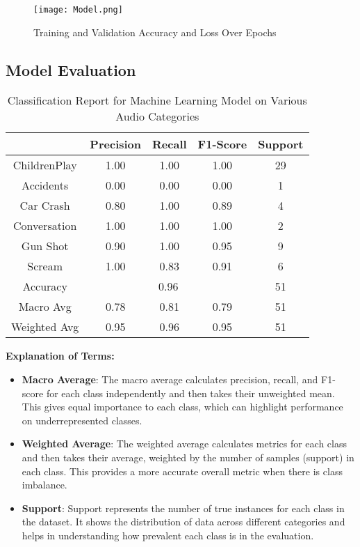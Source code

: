 \documentclass[conference]{IEEEtran}
\begin{document}
\begin{figure}[h!]
    \centering
    \texttt{[image: Model.png]}
    \caption{Training and Validation Accuracy and Loss Over Epochs}
    \label{fig:loss_plot}
\end{figure}

\subsection{Model Evaluation}
\begin{table}[h!]
    \centering
    \caption{Classification Report for Machine Learning Model on Various Audio Categories}
    \begin{tabular}{|c|c|c|c|c|}
        \hline
        & \textbf{Precision} & \textbf{Recall} & \textbf{F1-Score} & \textbf{Support} \\
        \hline
        ChildrenPlay & 1.00 & 1.00 & 1.00 & 29 \\
        Accidents & 0.00 & 0.00 & 0.00 & 1 \\
        Car Crash & 0.80 & 1.00 & 0.89 & 4 \\
        Conversation & 1.00 & 1.00 & 1.00 & 2 \\
        Gun Shot & 0.90 & 1.00 & 0.95 & 9 \\
        Scream & 1.00 & 0.83 & 0.91 & 6 \\
        \hline
        Accuracy & \multicolumn{3}{c|}{0.96} & 51 \\
        \hline
        Macro Avg & 0.78 & 0.81 & 0.79 & 51 \\
        Weighted Avg & 0.95 & 0.96 & 0.95 & 51 \\
        \hline
    \end{tabular}
    \label{tab:classification_report}
\end{table}

\noindent
\textbf{Explanation of Terms:}
\begin{itemize}
    \item \textbf{Macro Average}: The macro average calculates precision, recall, and F1-score for each class independently and then takes their unweighted mean. This gives equal importance to each class, which can highlight performance on underrepresented classes.
    \item \textbf{Weighted Average}: The weighted average calculates metrics for each class and then takes their average, weighted by the number of samples (support) in each class. This provides a more accurate overall metric when there is class imbalance.
    \item \textbf{Support}: Support represents the number of true instances for each class in the dataset. It shows the distribution of data across different categories and helps in understanding how prevalent each class is in the evaluation.    
\end{itemize}
\end{document}
